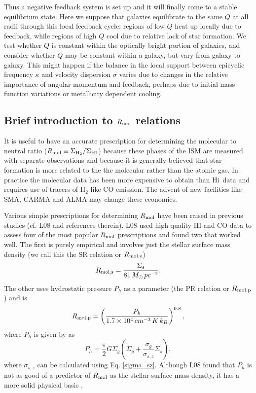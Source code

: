 \documentclass[12pt,preprint]{aastex}
\newcommand{\HI}{\mbox{\sc Hi}}
\begin{document}
Thus a negative feedback system is set up and it will finally come to a stable equilibrium state. Here we suppose that galaxies equilibrate to the same $Q$ at all radii through this local feedback cycle: regions of low $Q$ heat up locally due to feedback, while regions of high $Q$ cool due to relative lack of star formation. We test whether $Q$ is  constant within the optically bright portion of galaxies, and consider whether $Q$ may be constant within a galaxy, but vary from galaxy to galaxy. This might happen if the balance in the local support between epicyclic frequency $\kappa$ and velocity dispersion $\sigma$ varies due to changes in the relative importance of angular momentum and feedback, perhaps due to  initial mass function  variations \citep{meu09} or metallicity dependent cooling. 


\subsection{Brief introduction to $R_{\rm mol}$ relations}
\label{rmol}
It is useful to have an accurate prescription for determining the molecular to neutral ratio ($R_{\rm mol}\equiv \Sigma_{\rm H_2}/\Sigma_{\rm HI}$) because these phases of the ISM are measured with separate observations and because it is generally believed that star formation is more related to the the molecular rather than the atomic gas.  In practice the molecular data has been more expensive to obtain than \HI\ data and requires use of tracers of H$_2$ like CO emission.  The advent of new facilities like SMA, CARMA and ALMA may change these economics.  


Various simple prescriptions for determining $R_{\rm mol}$ have been raised in previous studies
 (cf. L08 and references therein).  L08 used high quality HI and CO data 
to assess four of the most popular $R_{\rm mol}$ prescriptions and found two that worked well.
The first is purely empirical and  involves just the stellar surface mass density (we call this the SR relation or $R_{\rm mol,s}$)
\begin{equation}
R_{\rm mol,s}=\frac{\Sigma_s}{81\, M_{\odot}\, pc^{-2}}.
\end{equation}
The other uses hydrostatic pressure $P_h$ as a parameter  (the PR relation or $R_{\rm mol,p}$) and is
\begin{equation}
R_{\rm mol,p}= \left(\frac{P_h}{1.7\times10^4\, cm^{-3}\,K\, k_B} \right)^{0.8},
\end{equation}
where $P_h$ is given by \citet{elm89} as
\begin{equation}
P_h= \frac{\pi}{2}G \Sigma_g(\Sigma_g+\frac{\sigma_g}{\sigma_{s,z}}\Sigma_s),
\end{equation}
where $\sigma_{s,z}$ can be calculated using Eq. \ref{sigma_sz}. Although L08 found that $P_h$ is not as good of a predictor of $R_{\rm mol}$ as the stellar surface mass density, it has a more solid physical basis \citep{won02,bli04,bli06,elm89,elm94}. 
\end{document}
